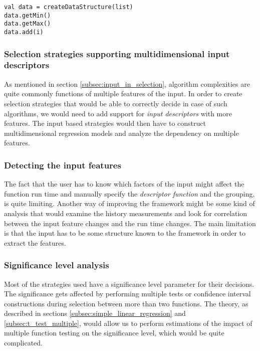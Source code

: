 \lstset{style=Scala}
\begin{lstlisting}
val data = createDataStructure(list)
data.getMin()
data.getMax()
data.add(i)
\end{lstlisting}

\subsubsection{Selection strategies supporting multidimensional input descriptors}

As mentioned in section \ref{subsec:input_in_selection}, algorithm complexities are quite commonly functions of multiple features of the input. In order to create selection strategies that would be able to correctly decide in case of such algorithms, we would need to add support for \textit{input descriptors} with more features. The input based strategies would then have to construct multidimensional regression models and analyze the dependency on multiple features.

\subsubsection{Detecting the input features}

The fact that the user has to know which factors of the input might affect the function run time and manually specify the \textit{descriptor function} and the grouping, is quite limiting. Another way of improving the framework might be some kind of analysis that would examine the history measurements and look for correlation between the input feature changes and the run time changes. The main limitation is that the input has to be some structure known to the framework in order to extract the features.

\subsubsection{Significance level analysis}

Most of the strategies used have a significance level parameter for their decisions. The significance gets affected by performing multiple tests or confidence interval constructions during selection between more than two functions. The theory, as described in sections \ref{subsec:simple_linear_regression} and \ref{subsec:t_test_multiple}, would allow us to perform estimations of the impact of multiple function testing on the significance level, which would be quite complicated. 

